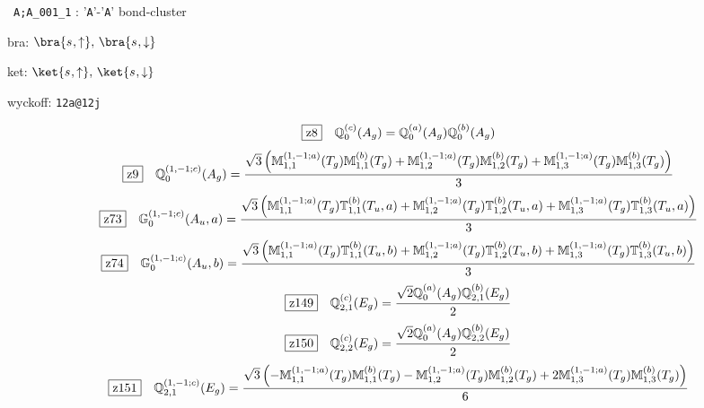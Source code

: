 \documentclass[fleqn,10pt,landscape]{jsarticle}
\begin{document}
\noindent\textbullet\, \texttt{A;A_001_1} : '\texttt{A}'-'\texttt{A}' bond-cluster

\noindent\quad * bra: $\bra{s_{},\uparrow},\, \bra{s_{},\downarrow}$

\noindent\quad * ket: $\ket{s_{},\uparrow},\, \ket{s_{},\downarrow}$

\noindent\quad * wyckoff: \texttt{12a@12j}

\begin{dmath*}
\hspace*{3mm}\fbox{z8}\quad \mathbb{Q}_{0}^{(c)}(A_{g})=\mathbb{Q}_{0}^{(a)}(A_{g}) \mathbb{Q}_{0}^{(b)}(A_{g})
\end{dmath*}
\begin{dmath*}
\hspace*{3mm}\fbox{z9}\quad \mathbb{Q}_{0}^{(1,-1;c)}(A_{g})=\frac{\sqrt{3} \left(\mathbb{M}_{1,1}^{(1,-1;a)}(T_{g}) \mathbb{M}_{1,1}^{(b)}(T_{g}) + \mathbb{M}_{1,2}^{(1,-1;a)}(T_{g}) \mathbb{M}_{1,2}^{(b)}(T_{g}) + \mathbb{M}_{1,3}^{(1,-1;a)}(T_{g}) \mathbb{M}_{1,3}^{(b)}(T_{g})\right)}{3}
\end{dmath*}
\begin{dmath*}
\hspace*{3mm}\fbox{z73}\quad \mathbb{G}_{0}^{(1,-1;c)}(A_{u},a)=\frac{\sqrt{3} \left(\mathbb{M}_{1,1}^{(1,-1;a)}(T_{g}) \mathbb{T}_{1,1}^{(b)}(T_{u},a) + \mathbb{M}_{1,2}^{(1,-1;a)}(T_{g}) \mathbb{T}_{1,2}^{(b)}(T_{u},a) + \mathbb{M}_{1,3}^{(1,-1;a)}(T_{g}) \mathbb{T}_{1,3}^{(b)}(T_{u},a)\right)}{3}
\end{dmath*}
\begin{dmath*}
\hspace*{3mm}\fbox{z74}\quad \mathbb{G}_{0}^{(1,-1;c)}(A_{u},b)=\frac{\sqrt{3} \left(\mathbb{M}_{1,1}^{(1,-1;a)}(T_{g}) \mathbb{T}_{1,1}^{(b)}(T_{u},b) + \mathbb{M}_{1,2}^{(1,-1;a)}(T_{g}) \mathbb{T}_{1,2}^{(b)}(T_{u},b) + \mathbb{M}_{1,3}^{(1,-1;a)}(T_{g}) \mathbb{T}_{1,3}^{(b)}(T_{u},b)\right)}{3}
\end{dmath*}
\begin{dmath*}
\hspace*{3mm}\fbox{z149}\quad \mathbb{Q}_{2,1}^{(c)}(E_{g})=\frac{\sqrt{2} \mathbb{Q}_{0}^{(a)}(A_{g}) \mathbb{Q}_{2,1}^{(b)}(E_{g})}{2}
\end{dmath*}
\begin{dmath*}
\hspace*{3mm}\fbox{z150}\quad \mathbb{Q}_{2,2}^{(c)}(E_{g})=\frac{\sqrt{2} \mathbb{Q}_{0}^{(a)}(A_{g}) \mathbb{Q}_{2,2}^{(b)}(E_{g})}{2}
\end{dmath*}
\begin{dmath*}
\hspace*{3mm}\fbox{z151}\quad \mathbb{Q}_{2,1}^{(1,-1;c)}(E_{g})=\frac{\sqrt{3} \left(- \mathbb{M}_{1,1}^{(1,-1;a)}(T_{g}) \mathbb{M}_{1,1}^{(b)}(T_{g}) - \mathbb{M}_{1,2}^{(1,-1;a)}(T_{g}) \mathbb{M}_{1,2}^{(b)}(T_{g}) + 2 \mathbb{M}_{1,3}^{(1,-1;a)}(T_{g}) \mathbb{M}_{1,3}^{(b)}(T_{g})\right)}{6}
\end{dmath*}
\end{document}
